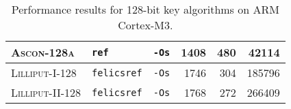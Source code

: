 \begin{table}[H]
\begin{tabular}{l|l|l||r|r|r}
      \textsc{Ascon-128a}      & \texttt{ref}       & \texttt{-Os}             &                   1408 &              480 &                            42114 \\ \hline
      \textsc{Lilliput-I-128}  & \texttt{felicsref} & \texttt{-Os}             &                   1746 &              304 &                           185796 \\ \hline
      \textsc{Lilliput-II-128} & \texttt{felicsref} & \texttt{-Os}             &                   1768 &              272 &                           266409 \\ \hline
  \end{tabular}
  \caption{Performance results for 128-bit key algorithms on ARM Cortex-M3.}
  \label{table:results/128-arm}
\end{table}

